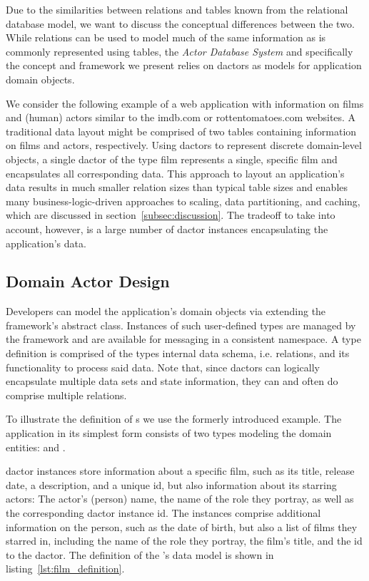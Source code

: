 Due to the similarities between \glspl{relation} and tables known from the relational database model, we want to discuss the conceptual differences between the two.
While \glspl{relation} can be used to model much of the same information as is commonly represented using tables, the \textit{Actor Database System} and specifically the concept and framework we present relies on \glspl{dactor} as models for application domain objects.

We consider the following example of a web application with information on films and (human) actors similar to the imdb.com or rottentomatoes.com websites.
A traditional data layout might be comprised of two tables containing information on films and actors, respectively.
Using \glspl{dactor} to represent discrete domain-level objects, a single \gls{dactor} of the type film represents a single, specific film and encapsulates all corresponding data.
This approach to layout an application's data results in much smaller \gls{relation} sizes than typical table sizes and enables many business-logic-driven approaches to scaling, data partitioning, and caching, which are discussed in section~\ref{subsec:discussion}.
The tradeoff to take into account, however, is a large number of \gls{dactor} instances encapsulating the application's data.

\subsection{Domain Actor Design}\label{subsec:domain_actor_design}

Developers can model the application's domain objects via extending the framework's abstract  class.
Instances of such user-defined  types are managed by the framework and are available for messaging in a consistent namespace.
A  type definition is comprised of the types internal data schema, i.e. \glspl{relation}, and its functionality to process said data.
Note that, since \glspl{dactor} can logically encapsulate multiple data sets and state information, they can and often do comprise multiple \glspl{relation}.

To illustrate the definition of s we use the formerly introduced example.
The application in its simplest form consists of two  types modeling the domain entities:  and .

 \gls{dactor} instances store information about a specific film, such as its title, release date, a description, and a unique id, but also information about its starring actors:
The actor's (person) name, the name of the role they portray, as well as the corresponding \gls{dactor} instance id.
The  instances comprise additional information on the person, such as the date of birth, but also a list of films they starred in, including the name of the role they portray, the film's title, and the id to the  \gls{dactor}.
The definition of the 's data model is shown in listing~\ref{lst:film_definition}.

